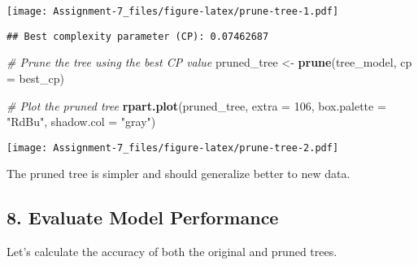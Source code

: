 \documentclass[
]{article}
\newenvironment{Shaded}{\begin{snugshade}}{\end{snugshade}}
\newcommand{\AttributeTok}[1]{\textcolor[rgb]{0.13,0.29,0.53}{#1}}
\newcommand{\CommentTok}[1]{\textcolor[rgb]{0.56,0.35,0.01}{\textit{#1}}}
\newcommand{\DecValTok}[1]{\textcolor[rgb]{0.00,0.00,0.81}{#1}}
\newcommand{\FunctionTok}[1]{\textcolor[rgb]{0.13,0.29,0.53}{\textbf{#1}}}
\newcommand{\NormalTok}[1]{#1}
\newcommand{\OtherTok}[1]{\textcolor[rgb]{0.56,0.35,0.01}{#1}}
\newcommand{\SpecialCharTok}[1]{\textcolor[rgb]{0.81,0.36,0.00}{\textbf{#1}}}
\newcommand{\StringTok}[1]{\textcolor[rgb]{0.31,0.60,0.02}{#1}}
\begin{document}
\texttt{[image: Assignment-7\_files/figure-latex/prune-tree-1.pdf]}

\begin{Shaded}
\end{Shaded}

\begin{verbatim}
## Best complexity parameter (CP): 0.07462687
\end{verbatim}

\begin{Shaded}
\begin{Highlighting}[]
\CommentTok{\# Prune the tree using the best CP value}
\NormalTok{pruned\_tree }\OtherTok{\textless{}{-}} \FunctionTok{prune}\NormalTok{(tree\_model, }\AttributeTok{cp =}\NormalTok{ best\_cp)}

\CommentTok{\# Plot the pruned tree}
\FunctionTok{rpart.plot}\NormalTok{(pruned\_tree, }\AttributeTok{extra =} \DecValTok{106}\NormalTok{, }\AttributeTok{box.palette =} \StringTok{"RdBu"}\NormalTok{, }\AttributeTok{shadow.col =} \StringTok{"gray"}\NormalTok{)}
\end{Highlighting}
\end{Shaded}

\texttt{[image: Assignment-7\_files/figure-latex/prune-tree-2.pdf]}

The pruned tree is simpler and should generalize better to new data.

\subsection{8. Evaluate Model
Performance}\label{evaluate-model-performance}

Let's calculate the accuracy of both the original and pruned trees.

\begin{Shaded}
\end{Shaded}
\end{document}
